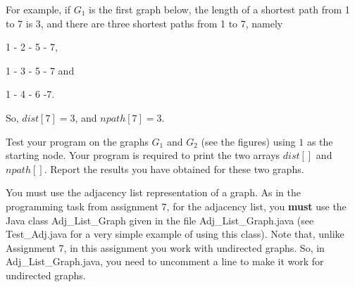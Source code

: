 \documentclass[11pt]{article}
\begin{document}
For example, if $G_1$ is the first graph below, the length of a shortest path from 1 to 7 is 3, and there are three shortest paths from 1 to 7, namely 

1 - 2 - 5 - 7, 

1 - 3 - 5 - 7 and 

1 - 4 - 6 -7.

So,  $dist[7]=3$, and $npath[7] = 3$.
\medskip


Test your program on the graphs $G_1$ and $G_2$ (see the figures) using $1$ as the starting node. Your program is required to print the two arrays $dist[]$ and $npath[]$. Report the results you have obtained for these two graphs. 


You must use the adjacency list representation of a graph. As in the programming task from assignment 7, for the adjacency list, you \textbf{must} use the Java class \textsf{Adj\_List\_Graph} given in the file \textsf{Adj\_List\_Graph.java} (see \textsf{Test\_Adj.java} for a very simple example of using this class).  Note that, unlike Assignment 7,  in this  assignment you work with undirected graphs. So,   in \textsf{Adj\_List\_Graph.java}, you need to uncomment a line to make it work for undirected graphs.  
\bigskip
\end{document}
